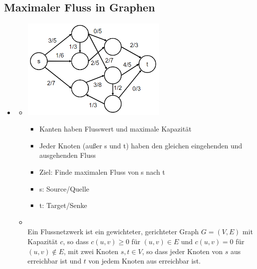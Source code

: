 \documentclass[
    12pt,
    a4paper,
    ngerman,
    color=3b,%
    marginpar=false,
    colorback=false,
    leqno,
]{tudaexercise}
\begin{document}
\subsection{Maximaler Fluss in Graphen}
    \begin{itemize}
        \item {}
            \begin{itemize}
                \item[]
                    \begin{minipage}{0.35\textwidth}
                        \includegraphics[width=7cm]{pictures/flussIdee.PNG}
                    \end{minipage}
                    \begin{minipage}{0.55\textwidth}
                        \begin{itemize}
                            \item Kanten haben Flusswert und maximale Kapazität
                            \item Jeder Knoten (außer s und t) haben den gleichen eingehenden und ausgehenden Fluss
                            \item Ziel: Finde maximalen Fluss von s nach t
                            \item s: Source/Quelle
                            \item t: Target/Senke
                        \end{itemize}
                    \end{minipage}
                \item {} \\
                        Ein Flussnetzwerk ist ein gewichteter, gerichteter Graph $G=(V,E)$ mit Kapazität $c$, so dass
                        $c(u,v) \geq 0$ für $(u,v) \in E$ und $c(u,v) = 0$ für $(u,v) \notin E$, mit zwei Knoten $s,t \in V$,
                        so dass jeder Knoten von $s$ aus erreichbar ist und $t$ von jedem Knoten aus erreichbar ist. 

\end{itemize}
\end{itemize}
\end{document}
